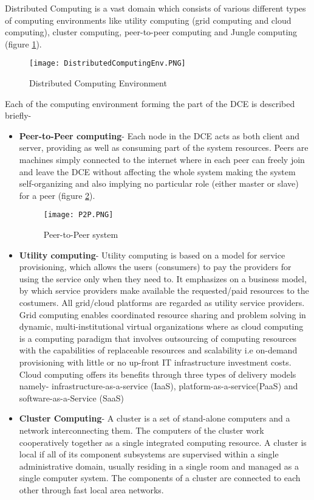 Distributed Computing is a vast domain which consists of various different types of computing environments like utility computing (grid computing and cloud computing), cluster computing, peer-to-peer computing and Jungle computing (figure \ref{fig:DistributedComputingEnv}). 

\begin{figure}[ht!]
\centering
\texttt{[image: DistributedComputingEnv.PNG]}
\caption{Distributed Computing Environment}
\label{fig:DistributedComputingEnv}
\end{figure}

Each of the computing environment forming the part of the DCE is described briefly-
\begin{itemize}
\item \textbf{Peer-to-Peer computing}- Each node in the DCE acts as both client and server, providing as well as consuming part of the system resources. Peers are machines simply connected to the internet where in each peer can freely join and leave the DCE without affecting the whole system making the system self-organizing  and also implying no particular role (either master or slave) for a peer (figure \ref{fig:P2P}).

\begin{figure}[ht!]
\centering
\texttt{[image: P2P.PNG]}
\caption{Peer-to-Peer system}
\label{fig:P2P}
\end{figure}

\item \textbf{Utility computing}- Utility computing is based on a model for service provisioning, which allows the users (consumers) to pay the providers for using the service only when they need to. It emphasizes on a business model, by which service providers make available the requested/paid resources to the costumers. All grid/cloud platforms are regarded as utility service providers. Grid computing enables coordinated resource sharing and problem solving in dynamic, multi-institutional virtual organizations where as cloud computing is a computing paradigm that involves outsourcing of computing resources with the capabilities of  replaceable resources and scalability i.e on-demand provisioning with little or no up-front IT infrastructure investment costs. Cloud computing offers its benefits through three types of delivery models namely- infrastructure-as-a-service (IaaS), platform-as-a-service(PaaS) and software-as-a-Service (SaaS) 

\item \textbf{Cluster Computing}- A cluster is a set of stand-alone computers and a network interconnecting them. The computers of the cluster work cooperatively together as a single integrated computing resource. A cluster is local if all of its component subsystems are supervised within a single administrative domain, usually residing in a single room and managed as a single computer system. The components of a cluster are connected to each other through fast local area networks. 


\end{itemize}

